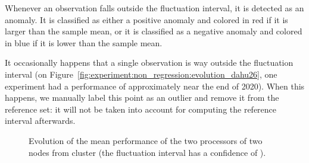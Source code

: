                 Whenever an observation falls outside the fluctuation interval, it is detected as an anomaly. It is
                classified as either a positive anomaly and colored in red if it is larger than the sample mean, or it
                is classified as a negative anomaly and colored in blue if it is lower than the sample mean.

                It occasionally happens that a single observation is way outside the fluctuation interval (\eg on
                Figure~\ref{fig:experiment:non_regression:evolution_dahu26}, one experiment had a performance of
                approximately  near the end of 2020). When this happens, we manually label
                this point as an outlier and remove it from the reference set: it will not be taken into account for
                computing the reference interval afterwards.

                \begin{figure}[htpb]
                    \centering
                    \caption{Evolution of the mean performance of the two processors of two nodes from cluster \dahu
                    (the fluctuation interval has a confidence of ).}%
                    \label{fig:experiment:non_regression:evolution_dahu}
                \end{figure}

